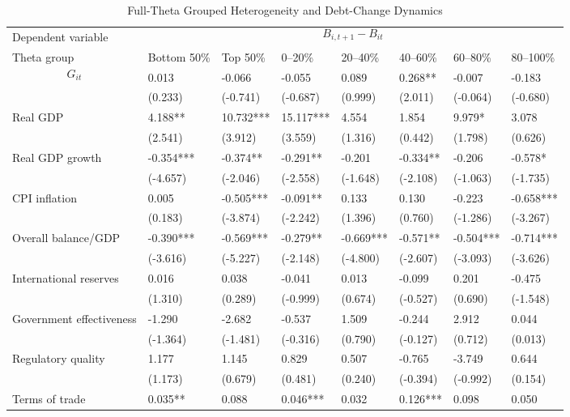 \begin{table}[H]\centering
\begin{threeparttable}
\caption{Full-Theta Grouped Heterogeneity and Debt-Change Dynamics}
\label{tab:theta_group_heterogeneity_debt}
\scriptsize
\begin{tabularx}{\textwidth}{lYYYYYYY}
\toprule
Dependent variable &  \\
\cmidrule(lr){2-8}
Theta group & Bottom 50\% & Top 50\% & 0--20\% & 20--40\% & 40--60\% & 60--80\% & 80--100\% \\
\midrule
$$G_{it}$$ & 0.013 & -0.066 & -0.055 & 0.089 & 0.268** & -0.007 & -0.183 \\
  & (0.233) & (-0.741) & (-0.687) & (0.999) & (2.011) & (-0.064) & (-0.680) \\
Real GDP & 4.188** & 10.732*** & 15.117*** & 4.554 & 1.854 & 9.979* & 3.078 \\
  & (2.541) & (3.912) & (3.559) & (1.316) & (0.442) & (1.798) & (0.626) \\
Real GDP growth & -0.354*** & -0.374** & -0.291** & -0.201 & -0.334** & -0.206 & -0.578* \\
  & (-4.657) & (-2.046) & (-2.558) & (-1.648) & (-2.108) & (-1.063) & (-1.735) \\
CPI inflation & 0.005 & -0.505*** & -0.091** & 0.133 & 0.130 & -0.223 & -0.658*** \\
  & (0.183) & (-3.874) & (-2.242) & (1.396) & (0.760) & (-1.286) & (-3.267) \\
Overall balance/GDP & -0.390*** & -0.569*** & -0.279** & -0.669*** & -0.571** & -0.504*** & -0.714*** \\
  & (-3.616) & (-5.227) & (-2.148) & (-4.800) & (-2.607) & (-3.093) & (-3.626) \\
International reserves & 0.016 & 0.038 & -0.041 & 0.013 & -0.099 & 0.201 & -0.475 \\
  & (1.310) & (0.289) & (-0.999) & (0.674) & (-0.527) & (0.690) & (-1.548) \\
Government effectiveness & -1.290 & -2.682 & -0.537 & 1.509 & -0.244 & 2.912 & 0.044 \\
  & (-1.364) & (-1.481) & (-0.316) & (0.790) & (-0.127) & (0.712) & (0.013) \\
Regulatory quality & 1.177 & 1.145 & 0.829 & 0.507 & -0.765 & -3.749 & 0.644 \\
  & (1.173) & (0.679) & (0.481) & (0.240) & (-0.394) & (-0.992) & (0.154) \\
Terms of trade & 0.035** & 0.088 & 0.046*** & 0.032 & 0.126*** & 0.098 & 0.050 \\

\end{tabularx}
\end{threeparttable}
\end{table}
